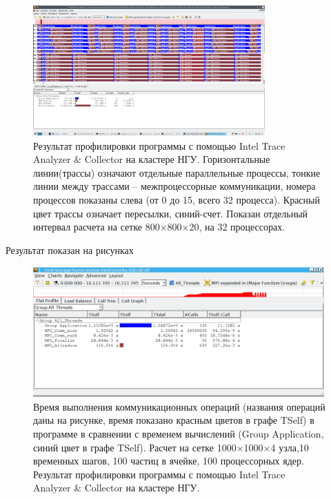\begin{figure}[h]
\begin{center}
\includegraphics[height=5cm,keepaspectratio]{images/scalingNSU-img17.png}
\caption{
Результат профилировки программы с помощью Intel Trace Analyzer \& Collector на кластере НГУ. Горизонтальные линии(трассы) означают отдельные параллельные процессы, тонкие линии между трассами – межпроцессорные коммуникации, номера процессов показаны слева (от 0 до 15, всего 32 процесса). Красный цвет трассы означает пересылки, синий-счет. Показан отдельный интервал расчета на сетке 800×800×20, на 32 процессорах.
}
\label{scale8}
\end{center} 
\end{figure}
	   
	   
	    Результат показан на рисунках 
\begin{figure}[h]
	\begin{center}
		\includegraphics[height=5cm,keepaspectratio]{images/scalingNSU-img18.png}
		\caption{
		 Время выполнения коммуникационных операций (названия операций даны на рисунке, время показано красным цветов в графе TSelf) в программе в сравнении с временем вычислений (Group Application, синий цвет в графе TSelf). Расчет на сетке 1000×1000×4 узла,10 временных шагов, 100 частиц в ячейке,  100 процессорных ядер. Результат профилировки программы с помощью Intel Trace Analyzer \& Collector на кластере НГУ.
		}
		\label{scale9}
	\end{center} 
\end{figure}	    
	   
